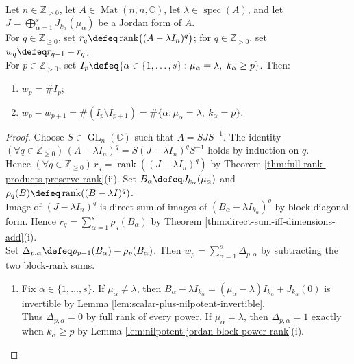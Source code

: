 \begin{theorem} \label{thm:jordan-block-sizes-from-rank-drops} \\
Let $n\in\mathbb{Z}_{>0}$, let $A\in\operatorname{Mat}(n,n,\mathbb{C})$, let $\lambda\in\operatorname{spec}(A)$, and let $J=\bigoplus\limits_{\alpha=1}^sJ_{k_{\alpha}}(\mu_{\alpha})$ be a Jordan form of $A$.\\
For $q\in\mathbb{Z}_{\geq0}$, set $r_q\defeq\operatorname{rank}\bigl((A-\lambda I_n)^q\bigr)$; for $q\in\mathbb{Z}_{>0}$, set $w_q\defeq r_{q-1}-r_q$.\\
For $p\in\mathbb{Z}_{>0}$, set $I_p\defeq\{\alpha\in\{1,\ldots,s\}:\mu_{\alpha}=\lambda,\ k_{\alpha}\geq p\}$. Then:
\begin{enumerate}[label=(\roman*)]
\setlength{\itemsep}{0pt}
\item $w_p=\# I_p$;
\item $w_p-w_{p+1}=\#(I_p\setminus I_{p+1})=\#\{\alpha:\mu_{\alpha}=\lambda,\ k_{\alpha}=p\}$.
\end{enumerate}
\begin{proof}
Choose $S\in\operatorname{GL}_n(\mathbb{C})$ such that $A=SJS^{-1}$. The identity $(\forall q\in\mathbb{Z}_{\geq0})\,(A-\lambda I_n)^q=S(J-\lambda I_n)^qS^{-1}$ holds by induction on $q$.\\
Hence $(\forall q\in\mathbb{Z}_{\geq0})\,r_q=\operatorname{rank}((J-\lambda I_n)^q)$ by Theorem \ref{thm:full-rank-products-preserve-rank}(ii). Set $B_{\alpha}\defeq J_{k_{\alpha}}(\mu_{\alpha})$ and $\rho_q(B)\defeq\operatorname{rank}((B-\lambda I)^q)$.\\
Image of $(J-\lambda I_n)^q$ is direct sum of images of $(B_{\alpha}-\lambda I_{k_{\alpha}})^q$ by block-diagonal form. Hence $r_q=\sum\limits_{\alpha=1}^{s}\rho_q(B_{\alpha})$ by Theorem \ref{thm:direct-sum-iff-dimensions-add}(i).\\
Set $\Delta_{p,\alpha}\defeq\rho_{p-1}(B_{\alpha})-\rho_p(B_{\alpha})$. Then $w_p=\sum\limits_{\alpha=1}^{s}\Delta_{p,\alpha}$ by subtracting the two block-rank sums.
\begin{enumerate}[label=(\roman*)]
\setlength{\itemsep}{0pt}
\item Fix $\alpha\in\{1,\ldots,s\}$. If $\mu_{\alpha}\neq\lambda$, then $B_{\alpha}-\lambda I_{k_{\alpha}}=(\mu_{\alpha}-\lambda)I_{k_{\alpha}}+J_{k_{\alpha}}(0)$ is invertible by Lemma \ref{lem:scalar-plus-nilpotent-invertible}.\\
Thus $\Delta_{p,\alpha}=0$ by full rank of every power. If $\mu_{\alpha}=\lambda$, then $\Delta_{p,\alpha}=1$ exactly when $k_{\alpha}\geq p$ by Lemma \ref{lem:nilpotent-jordan-block-power-rank}(i).\\

\end{enumerate}
\end{proof}
\end{theorem}
